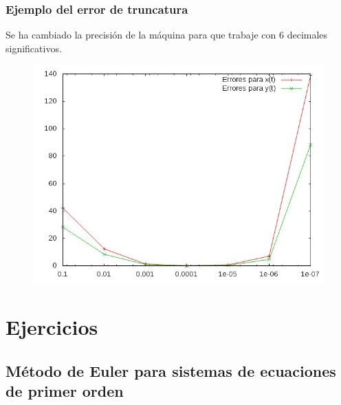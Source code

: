 \documentclass{beamer}
\begin{document}
\begin{frame}
	\frametitle{Ejemplo del error de truncatura}

		Se ha cambiado la precisión de la máquina para que trabaje con 6 decimales significativos.
		\begin{figure}
		\centering
		\includegraphics[scale=0.4]{img/graph_error_comb}
		\end{figure}

\end{frame}

\section{Ejercicios}

\subsection{Método de Euler para sistemas de ecuaciones de primer orden}
\end{document}
